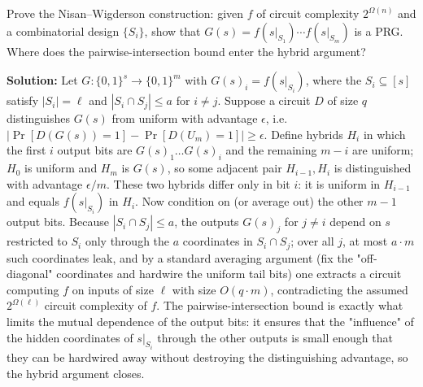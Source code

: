 \begin{exercise}[Challenge]
Prove the Nisan--Wigderson construction: given $f$ of circuit complexity $2^{\Omega(n)}$ and a combinatorial design $\{S_i\}$, show that $G(s) = f(s|_{S_1}) \cdots f(s|_{S_m})$ is a PRG. Where does the pairwise-intersection bound enter the hybrid argument?
\end{exercise}
\textbf{Solution:} Let $G: \{0,1\}^s \to \{0,1\}^m$ with $G(s)_i = f(s|_{S_i})$, where the $S_i \subseteq [s]$ satisfy $|S_i| = \ell$ and $|S_i \cap S_j| \le a$ for $i \neq j$. Suppose a circuit $D$ of size $q$ distinguishes $G(s)$ from uniform with advantage $\epsilon$, i.e.\ $|\Pr[D(G(s)) = 1] - \Pr[D(U_m) = 1]| \ge \epsilon$. Define hybrids $H_i$ in which the first $i$ output bits are $G(s)_1 \ldots G(s)_i$ and the remaining $m-i$ are uniform; $H_0$ is uniform and $H_m$ is $G(s)$, so some adjacent pair $H_{i-1}, H_i$ is distinguished with advantage $\epsilon/m$. These two hybrids differ only in bit $i$: it is uniform in $H_{i-1}$ and equals $f(s|_{S_i})$ in $H_i$. Now condition on (or average out) the other $m-1$ output bits. Because $|S_i \cap S_j| \le a$, the outputs $G(s)_j$ for $j \neq i$ depend on $s$ restricted to $S_i$ only through the $a$ coordinates in $S_i \cap S_j$; over all $j$, at most $a \cdot m$ such coordinates leak, and by a standard averaging argument (fix the "off-diagonal" coordinates and hardwire the uniform tail bits) one extracts a circuit computing $f$ on inputs of size $\ell$ with size $O(q \cdot m)$, contradicting the assumed $2^{\Omega(\ell)}$ circuit complexity of $f$. The pairwise-intersection bound is exactly what limits the mutual dependence of the output bits: it ensures that the "influence" of the hidden coordinates of $s|_{S_i}$ through the other outputs is small enough that they can be hardwired away without destroying the distinguishing advantage, so the hybrid argument closes.

